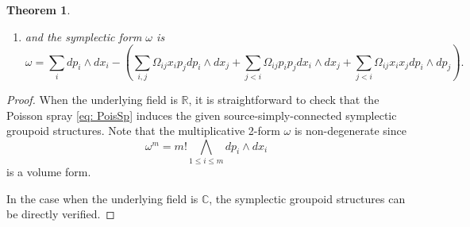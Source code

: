 \documentclass{amsart}
\newtheorem{theorem}{Theorem}[section]
\numberwithin{equation}{section}
\newcommand{\bfx}{\mathbf{x}}
\newcommand{\CC}{\mathbb{C}}
\newcommand{\RR}{\mathbb{R}}
\begin{document}
\begin{theorem}
\begin{enumerate}
		\item and the symplectic form $\omega$ is
		\begin{equation}\label{eq:2-formG_A}
			\omega = \sum_{i} dp_i \wedge dx_i
			- \left(
			\sum_{i, j} \Omega_{ij}x_i p_j d p_i \wedge d x_j 
			+ \sum_{j < i} \Omega_{ij}p_ip_j d x_i \wedge d x_j
			+ \sum_{j < i} \Omega_{ij}x_ix_j d p_i \wedge d p_j
			\right).
		\end{equation}
	\end{enumerate}
\end{theorem}

\begin{proof}
	When the underlying field is $\RR$, it is straightforward to check that the Poisson spray \eqref{eq: PoisSp} induces the given source-simply-connected symplectic groupoid structures. Note that the multiplicative 2-form $\omega$ is non-degenerate since
	\[
		\omega^m = m! \bigwedge\limits_{1\leq i\leq m} dp_i \wedge dx_i
	\]
is a volume form.

	In the case when the underlying field is $\CC$, the symplectic groupoid structures can be directly verified.
\end{proof}
\end{document}
